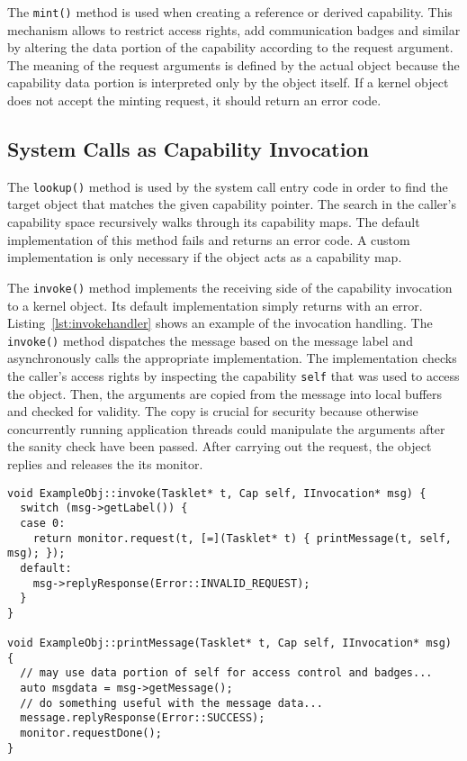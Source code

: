 The \texttt{mint()} method is used when creating a reference or derived capability. This mechanism allows to restrict access rights, add communication badges and similar by altering the data portion of the capability according to the request argument. The meaning of the request arguments is defined by the actual object because the capability data portion is interpreted only by the object itself. If a kernel object does not accept the minting request, it should return an error code.

\subsection{System Calls as Capability Invocation}

The \texttt{lookup()} method is used by the system call entry code in
order to find the target object that matches the given capability
pointer. The search in the caller's capability space recursively walks
through its capability maps. The default implementation of this method
fails and returns an error code. A custom implementation is only
necessary if the object acts as a capability map.

The \texttt{invoke()} method implements the receiving side of the
capability invocation to a kernel object. Its default implementation
simply returns with an error. Listing~\ref{lst:invokehandler} shows an
example of the invocation handling. The \texttt{invoke()} method
dispatches the message based on the message label and asynchronously
calls the appropriate implementation. The implementation checks the
caller's access rights by inspecting the capability \texttt{self} that
was used to access the object. Then, the arguments are copied from the
message into local buffers and checked for validity. The copy is
crucial for security because otherwise concurrently running
application threads could manipulate the arguments after the sanity
check have been passed. After carrying out the request, the object
replies and releases the its monitor.

\begin{lstlisting}[float, label=lst:invokehandler, caption=Example invocation 
handler.]
void ExampleObj::invoke(Tasklet* t, Cap self, IInvocation* msg) {
  switch (msg->getLabel()) {
  case 0:
    return monitor.request(t, [=](Tasklet* t) { printMessage(t, self, msg); });
  default:
    msg->replyResponse(Error::INVALID_REQUEST);
  }
}

void ExampleObj::printMessage(Tasklet* t, Cap self, IInvocation* msg) {
  // may use data portion of self for access control and badges...
  auto msgdata = msg->getMessage();
  // do something useful with the message data...
  message.replyResponse(Error::SUCCESS);
  monitor.requestDone();
}
\end{lstlisting}

